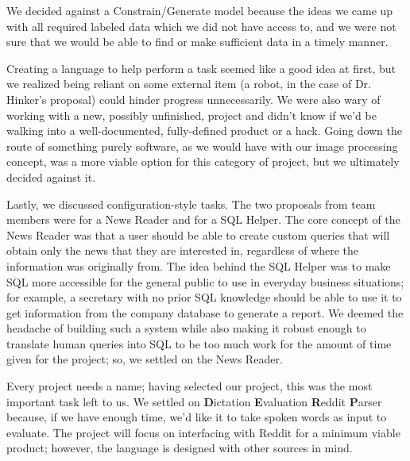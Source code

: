\documentclass{article}
\begin{document}
We decided against a Constrain/Generate model because the ideas we came up with all required labeled data which we did not have access to, and we were not sure that we would be able to find or make sufficient data in a timely manner.

Creating a language to help perform a task seemed like a good idea at first, but we realized being reliant on some external item (a robot, in the case of Dr. Hinker's proposal) could hinder progress unnecessarily. We were also wary of working with a new, possibly unfinished, project and didn't know if we'd be walking into a well-documented, fully-defined product or a hack. Going down the route of something purely software, as we would have with our image processing concept, was a more viable option for this category of project, but we ultimately decided against it.

\begin{comment}
Do we want to talk about why we didn't go with the image processing project?
\end{comment}

Lastly, we discussed configuration-style tasks. The two proposals from team members were for a News Reader and for a SQL Helper. The core concept of the News Reader was that a user should be able to create custom queries that will obtain only the news that they are interested in, regardless of where the information was originally from. The idea behind the SQL Helper was to make SQL more accessible for the general public to use in everyday business situations; for example, a secretary with no prior SQL knowledge should be able to use it to get information from the company database to generate a report. We deemed the headache of building such a system while also making it robust enough to translate human queries into SQL to be too much work for the amount of time given for the project; so, we settled on the News Reader.

Every project needs a name; having selected our project, this was the most important task left to us. We settled on \textbf{D}ictation \textbf{E}valuation \textbf{R}eddit \textbf{P}arser because, if we have enough time, we'd like it to take spoken words as input to evaluate. The project will focus on interfacing with Reddit for a minimum viable product; however, the language is designed with other sources in mind.
\end{document}
